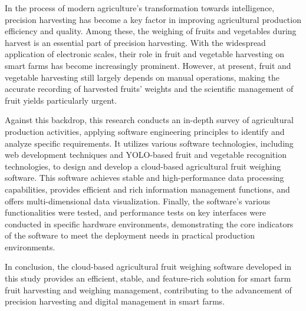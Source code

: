 In the process of modern agriculture’s transformation towards intelligence, precision harvesting has become a key factor in improving agricultural production efficiency and quality. Among these, the weighing of fruits and vegetables during harvest is an essential part of precision harvesting. With the widespread application of electronic scales, their role in fruit and vegetable harvesting on smart farms has become increasingly prominent. However, at present, fruit and vegetable harvesting still largely depends on manual operations, making the accurate recording of harvested fruits’ weights and the scientific management of fruit yields particularly urgent.

Against this backdrop, this research conducts an in-depth survey of agricultural production activities, applying software engineering principles to identify and analyze specific requirements. It utilizes various software technologies, including web development techniques and YOLO-based fruit and vegetable recognition technologies, to design and develop a cloud-based agricultural fruit weighing software. This software achieves stable and high-performance data processing capabilities, provides efficient and rich information management functions, and offers multi-dimensional data visualization. Finally, the software’s various functionalities were tested, and performance tests on key interfaces were conducted in specific hardware environments, demonstrating the core indicators of the software to meet the deployment needs in practical production environments.

In conclusion, the cloud-based agricultural fruit weighing software developed in this study provides an efficient, stable, and feature-rich solution for smart farm fruit harvesting and weighing management, contributing to the advancement of precision harvesting and digital management in smart farms.